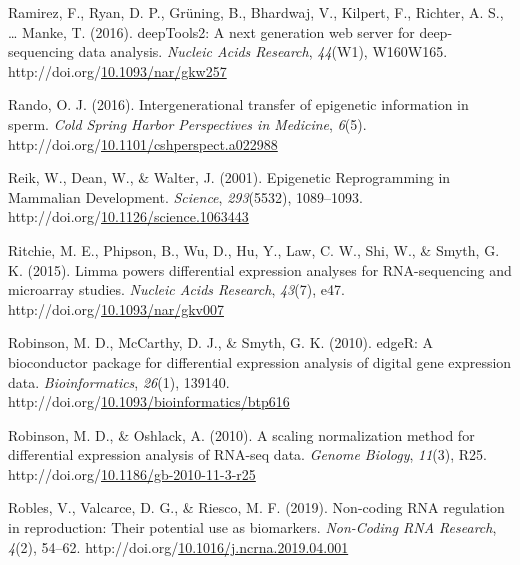 \documentclass[12pt,twoside]{reedthesis}
\newlength{\cslhangindent}
\newenvironment{CSLReferences}[2] %
 {%
  \setlength{\parindent}{0pt}
  \ifodd #1 \everypar{\setlength{\hangindent}{\cslhangindent}}\ignorespaces\fi
  \ifnum #2 > 0
  \setlength{\parskip}{#2\baselineskip}
  \fi
 }%
 {}
\begin{document}
\begin{CSLReferences}{1}{0}
\leavevmode{}%
Ramirez, F., Ryan, D. P., Grüning, B., Bhardwaj, V., Kilpert, F., Richter, A. S., \ldots{} Manke, T. (2016). deepTools2: A next generation web server for deep-sequencing data analysis. \emph{Nucleic Acids Research}, \emph{44}(W1), W160W165. http://doi.org/\href{https://doi.org/10.1093/nar/gkw257}{10.1093/nar/gkw257}

\leavevmode{}%
Rando, O. J. (2016). Intergenerational transfer of epigenetic information in sperm. \emph{Cold Spring Harbor Perspectives in Medicine}, \emph{6}(5). http://doi.org/\href{https://doi.org/10.1101/cshperspect.a022988}{10.1101/cshperspect.a022988}

\leavevmode{}%
Reik, W., Dean, W., \& Walter, J. (2001). Epigenetic Reprogramming in Mammalian Development. \emph{Science}, \emph{293}(5532), 1089--1093. http://doi.org/\href{https://doi.org/10.1126/science.1063443}{10.1126/science.1063443}

\leavevmode{}%
Ritchie, M. E., Phipson, B., Wu, D., Hu, Y., Law, C. W., Shi, W., \& Smyth, G. K. (2015). Limma powers differential expression analyses for RNA-sequencing and microarray studies. \emph{Nucleic Acids Research}, \emph{43}(7), e47. http://doi.org/\href{https://doi.org/10.1093/nar/gkv007}{10.1093/nar/gkv007}

\leavevmode{}%
Robinson, M. D., McCarthy, D. J., \& Smyth, G. K. (2010). edgeR: A bioconductor package for differential expression analysis of digital gene expression data. \emph{Bioinformatics}, \emph{26}(1), 139140. http://doi.org/\href{https://doi.org/10.1093/bioinformatics/btp616}{10.1093/bioinformatics/btp616}

\leavevmode{}%
Robinson, M. D., \& Oshlack, A. (2010). A scaling normalization method for differential expression analysis of RNA-seq data. \emph{Genome Biology}, \emph{11}(3), R25. http://doi.org/\href{https://doi.org/10.1186/gb-2010-11-3-r25}{10.1186/gb-2010-11-3-r25}

\leavevmode{}%
Robles, V., Valcarce, D. G., \& Riesco, M. F. (2019). Non-coding RNA regulation in reproduction: Their potential use as biomarkers. \emph{Non-Coding RNA Research}, \emph{4}(2), 54--62. http://doi.org/\href{https://doi.org/10.1016/j.ncrna.2019.04.001}{10.1016/j.ncrna.2019.04.001}


\end{CSLReferences}
\end{document}
